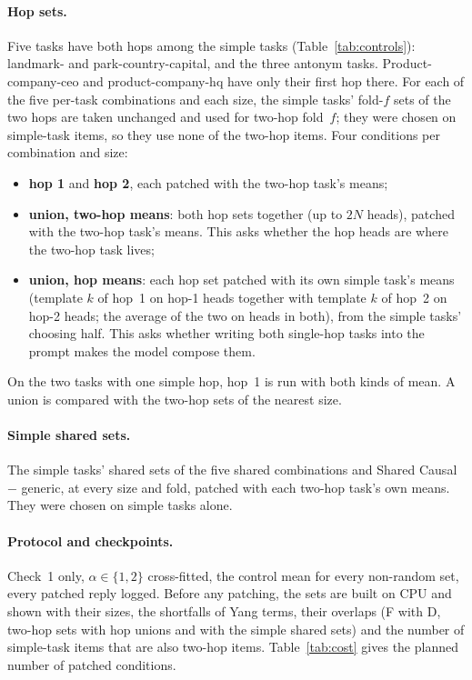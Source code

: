 \documentclass[10pt,a4paper]{article}
\begin{document}
\paragraph{Hop sets.} Five tasks have both hops among the simple tasks (Table~\ref{tab:controls}): landmark- and park-country-capital, and the three antonym tasks. Product-company-ceo and product-company-hq have only their first hop there. For each of the five per-task combinations and each size, the simple tasks' fold-$f$ sets of the two hops are taken unchanged and used for two-hop fold~$f$; they were chosen on simple-task items, so they use none of the two-hop items. Four conditions per combination and size:
\begin{itemize}
\item \textbf{hop 1} and \textbf{hop 2}, each patched with the two-hop task's means;
\item \textbf{union, two-hop means}: both hop sets together (up to $2N$ heads), patched with the two-hop task's means. This asks whether the hop heads are where the two-hop task lives;
\item \textbf{union, hop means}: each hop set patched with its own simple task's means (template $k$ of hop~1 on hop-1 heads together with template $k$ of hop~2 on hop-2 heads; the average of the two on heads in both), from the simple tasks' choosing half. This asks whether writing both single-hop tasks into the prompt makes the model compose them.
\end{itemize}
On the two tasks with one simple hop, hop~1 is run with both kinds of mean. A union is compared with the two-hop sets of the nearest size.

\paragraph{Simple shared sets.} The simple tasks' shared sets of the five shared combinations and Shared Causal $-$ generic, at every size and fold, patched with each two-hop task's own means. They were chosen on simple tasks alone.

\paragraph{Protocol and checkpoints.} Check~1 only, $\alpha\in\{1,2\}$ cross-fitted, the control mean for every non-random set, every patched reply logged. Before any patching, the sets are built on CPU and shown with their sizes, the shortfalls of Yang terms, their overlaps (F with D, two-hop sets with hop unions and with the simple shared sets) and the number of simple-task items that are also two-hop items. Table~\ref{tab:cost} gives the planned number of patched conditions.
\end{document}
